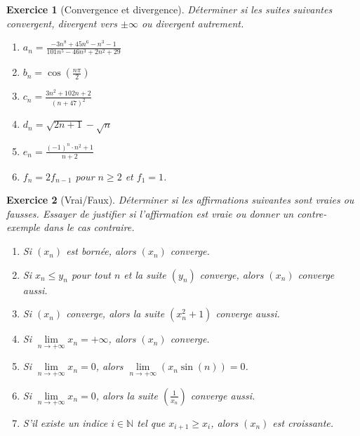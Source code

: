 \documentclass[11.5pt,french,table]{article}
\theoremstyle{exercice}
\newtheorem{exercice}{Exercice}
\begin{document}
\begin{exercice}[Convergence et divergence]
Déterminer si les suites suivantes convergent, divergent vers $\pm \infty$ ou divergent autrement.
\begin{enumerate}
    \item $\displaystyle a_n = \frac{-3n^8 + 45n^6 - n^3 - 1}{101n^5 - 46n^3 + 2n^2 + 29}$
    \item $\displaystyle b_n = \cos \left( \frac{n \pi}{2} \right)$
    \item $\displaystyle c_n = \frac{3n^2 + 102n + 2}{(n+47)^2}$
    \item $\displaystyle d_n =  \sqrt{2n + 1} - \sqrt{n}$
    \item $\displaystyle e_n =  \frac{(-1)^n \cdot n^2 + 1}{n + 2}$
    \item $\displaystyle f_n =  2f_{n-1}$ pour $n \geq 2$ et $f_1 = 1$.
\end{enumerate}
\end{exercice}

\begin{exercice}[Vrai/Faux]
Déterminer si les affirmations suivantes sont vraies ou fausses. Essayer de justifier si l'affirmation est vraie ou donner un contre-exemple dans le cas contraire.
\begin{enumerate}
    \item Si $(x_n)$ est bornée, alors $(x_n)$ converge.
    \item Si $x_n \leq y_n$ pour tout $n$ et la suite $(y_n)$ converge, alors $(x_n)$ converge aussi.
    \item Si $(x_n)$ converge, alors la suite $(x_n^2+1)$ converge aussi.
    \item Si $\lim \limits_{n \to +\infty} x_n = +\infty$, alors $(x_n)$ converge.
    \item Si $\lim \limits_{n \to +\infty} x_n = 0$, alors $\lim \limits_{n \to +\infty} (x_n \sin(n)) = 0$.
    \item Si $\lim \limits_{n \to +\infty} x_n = 0$, alors la suite $\displaystyle \left(\frac{1}{x_n} \right)$ converge aussi.
    \item S'il existe un indice $i \in \mathbb N$ tel que $x_{i+1} \geq x_i$, alors $(x_n)$ est croissante.
\end{enumerate}
\end{exercice}
\end{document}
